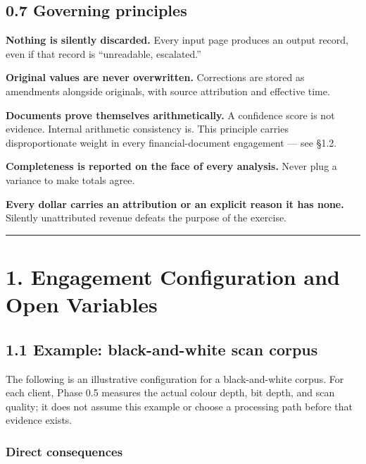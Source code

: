\documentclass[
]{article}
\newcounter{none} %
\begin{document}
\subsection{0.7 Governing principles}\label{governing-principles}

\textbf{Nothing is silently discarded.} Every input page produces an
output record, even if that record is ``unreadable, escalated.''

\textbf{Original values are never overwritten.} Corrections are stored
as amendments alongside originals, with source attribution and effective
time.

\textbf{Documents prove themselves arithmetically.} A confidence score
is not evidence. Internal arithmetic consistency is. This principle
carries disproportionate weight in every financial-document engagement
--- see §1.2.

\textbf{Completeness is reported on the face of every analysis.} Never
plug a variance to make totals agree.

\textbf{Every dollar carries an attribution or an explicit reason it has
none.} Silently unattributed revenue defeats the purpose of the
exercise.

\begin{center}\rule{0.5\linewidth}{0.5pt}\end{center}

\section{1. Engagement Configuration and Open
Variables}\label{engagement-configuration-and-open-variables}

\subsection{1.1 Example: black-and-white scan
corpus}\label{example-black-and-white-scan-corpus}

The following is an illustrative configuration for a black-and-white
corpus. For each client, Phase 0.5 measures the actual colour depth, bit
depth, and scan quality; it does not assume this example or choose a
processing path before that evidence exists.

\subsubsection{Direct consequences}\label{direct-consequences}
\end{document}
